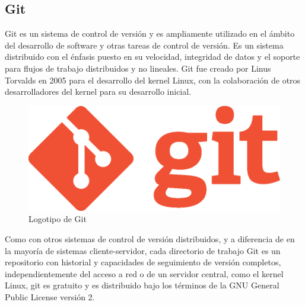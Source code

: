 \subsection{Git}

Git\cite{Git} es un sistema de control de versión y es ampliamente utilizado en el ámbito del desarrollo de software y otras tareas de control de versión. Es un sistema distribuido con el énfasis puesto en su velocidad, integridad de datos y el soporte para flujos de trabajo distribuidos y no lineales. Git fue creado por Linus Torvalds en 2005 para el desarrollo del kernel Linux, con la colaboración de otros desarrolladores del kernel para su desarrollo inicial.

\begin{figure}[!htp]
	 \centering
	 \includegraphics[scale=0.2]{fig/git_logo}
	 \caption{Logotipo de Git}
\end{figure}

Como con otros sistemas de control de versión distribuidos, y a diferencia de en la mayoría de sistemas cliente-servidor, cada directorio de trabajo Git es un repositorio con historial y capacidades de seguimiento de versión completos, independientemente del acceso a red o de un servidor central, como el kernel Linux, git es gratuito y es distribuido bajo los términos de la GNU General Public License versión 2.